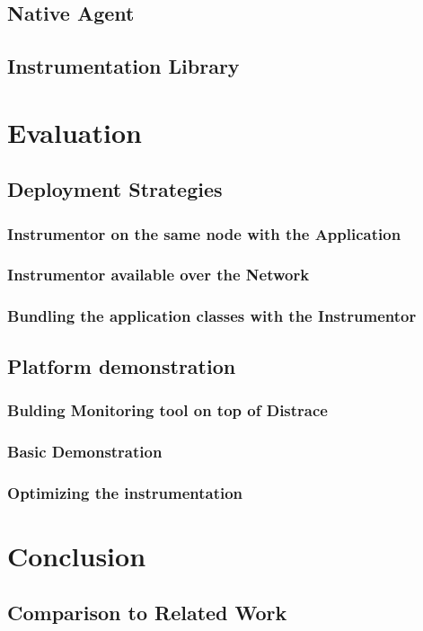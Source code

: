\documentclass[12pt,a4paper]{report}
\begin{document}
\section{Native Agent}
\section{Instrumentation Library}

\chapter{Evaluation}
\section{Deployment Strategies}
\subsection{Instrumentor on the same node with the Application}
\subsection{Instrumentor available over the Network}
\subsection{Bundling the application classes with the Instrumentor}
\section{Platform demonstration}
\subsection{Bulding Monitoring tool on top of Distrace}
\subsection{Basic Demonstration}
\subsection{Optimizing the instrumentation}
\chapter{Conclusion}
\section{Comparison to Related Work}
\end{document}
